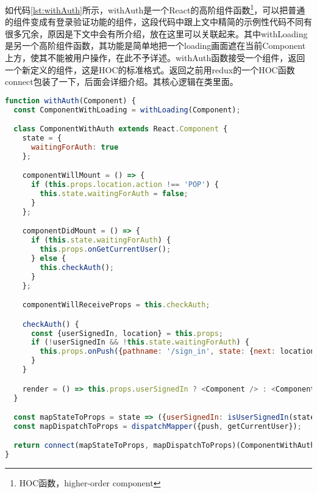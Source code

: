 如代码\ref{lst:withAuth}所示，withAuth是一个React的高阶组件函数\footnote{HOC函数，higher-order component}，可以把普通的组件变成有登录验证功能的组件，这段代码中跟上文中精简的示例性代码不同有很多冗余，原因是下文中会有所介绍，放在这里可以关联起来。其中withLoading是另一个高阶组件函数，其功能是简单地把一个loading画面遮在当前Component上方，使其不能被用户操作，在此不予详述。withAuth函数接受一个组件，返回一个新定义的组件，这是HOC的标准格式。返回之前用redux的一个HOC函数connect包装了一下，后面会详细介绍。其核心逻辑在类里面。

\begin{lstlisting}[language={JavaScript}, label={lst:withAuth}, caption={withAuth高阶组件函数}]
function withAuth(Component) {
  const ComponentWithLoading = withLoading(Component);

  class ComponentWithAuth extends React.Component {
    state = {
      waitingForAuth: true
    };

    componentWillMount = () => {
      if (this.props.location.action !== 'POP') {
        this.state.waitingForAuth = false;
      }
    };

    componentDidMount = () => {
      if (this.state.waitingForAuth) {
        this.props.onGetCurrentUser();
      } else {
        this.checkAuth();
      }
    };

    componentWillReceiveProps = this.checkAuth;

    checkAuth() {
      const {userSignedIn, location} = this.props;
      if (!userSignedIn && !this.state.waitingForAuth) {
        this.props.onPush({pathname: '/sign_in', state: {next: location}});
      }
    }

    render = () => this.props.userSignedIn ? <Component /> : <ComponentWithLoading />;
  }

  const mapStateToProps = state => ({userSignedIn: isUserSignedIn(state)});
  const mapDispatchToProps = dispatchMapper({push, getCurrentUser});

  return connect(mapStateToProps, mapDispatchToProps)(ComponentWithAuth);
}
\end{lstlisting}

